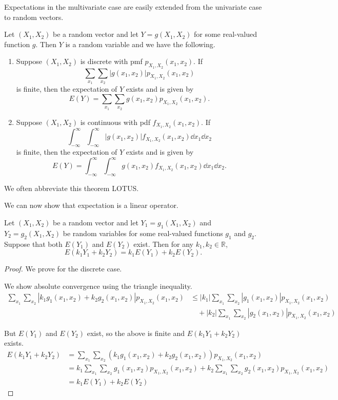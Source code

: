 Expectations in the multivariate case are easily extended from the univariate case to random vectors.

\begin{theorem}\label{thm:lotus2}
	Let $(X_1,X_2)$ be a random vector and let $Y=g(X_1,X_2)$ for some real-valued function $g$. Then $Y$ is a random variable and we have the following.
	\begin{enumerate}[label=\color{main}(\alph*)]
		\item Suppose $(X_1,X_2)$ is discrete with pmf $p_{X_1,X_2}(x_1,x_2)$. If $$\sum_{x_1}\sum_{x_2}|g(x_1,x_2)|p_{X_1,X_2}(x_1,x_2)$$ is finite, then the expectation of $Y$ exists and is given by $$E(Y)=\sum_{x_1}\sum_{x_2}g(x_1,x_2)p_{X_1,X_2}(x_1,x_2).$$
		\item Suppose $(X_1,X_2)$ is continuous with pdf $f_{X_1,X_2}(x_1,x_2)$. If $$\int_{-\infty}^{\infty}\int_{-\infty}^{\infty}|g(x_1,x_2)|f_{X_1,X_2}(x_1,x_2)\dd{x_1}\dd{x_2}$$ is finite, then the expectation of $Y$ exists and is given by $$E(Y)=\int_{-\infty}^{\infty}\int_{-\infty}^{\infty}g(x_1,x_2)f_{X_1,X_2}(x_1,x_2)\dd{x_1}\dd{x_2}.$$
	\end{enumerate}
\end{theorem}

We often abbreviate this theorem LOTUS.

We can now show that expectation is a linear operator.

\begin{theorem}
	Let $(X_1,X_2)$ be a random vector and let $Y_1=g_1(X_1,X_2)$ and $Y_2=g_2(X_1,X_2)$ be random variables for some real-valued functions $g_1$ and $g_2$. Suppose that both $E(Y_1)$ and $E(Y_2)$ exist. Then for any $k_1,k_2\in\mathbb R$,
	$$E(k_1Y_1+k_2Y_2)=k_1E(Y_1)+k_2E(Y_2).$$
\end{theorem}

\begin{proof}
	We prove for the discrete case.

	We show absolute convergence using the triangle inequality.
	\begin{align*}
		\sum_{x_1}\sum_{x_2}|k_1g_1(x_1,x_2)+k_2g_2(x_1,x_2)|p_{X_1,X_2}(x_1,x_2)&\leq |k_1|\sum_{x_1}\sum_{x_2}|g_1(x_1,x_2)|p_{X_1,X_2}(x_1,x_2)\\
		&\quad+|k_2|\sum_{x_1}\sum_{x_2}|g_2(x_1,x_2)|p_{X_1,X_2}(x_1,x_2)
	\end{align*}

	But $E(Y_1)$ and $E(Y_2)$ exist, so the above is finite and $E(k_1Y_1+k_2Y_2)$ exists.
	\begin{align*}
		E(k_1Y_1+k_2Y_2)&=\sum_{x_1}\sum_{x_2}(k_1g_1(x_1,x_2)+k_2g_2(x_1,x_2))p_{X_1,X_2}(x_1,x_2)\\
		&=k_1\sum_{x_1}\sum_{x_2}g_1(x_1,x_2)p_{X_1,X_2}(x_1,x_2)+k_2\sum_{x_1}\sum_{x_2}g_2(x_1,x_2)p_{X_1,X_2}(x_1,x_2)\\
		&=k_1E(Y_1)+k_2E(Y_2)
	\end{align*}
\end{proof}

